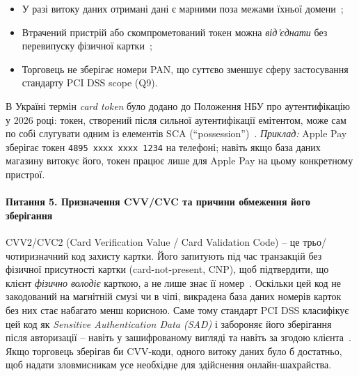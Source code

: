 \begin{itemize}[noitemsep]
    \item У разі витоку даних отримані дані є марними поза межами їхньої домени~\cite{emv_tokenisation_qrg};
    \item Втрачений пристрій або скомпрометований токен можна \emph{від'єднати} без перевипуску фізичної 
        картки~\cite{emv_tokenisation};
    \item Торговець не зберігає номери PAN, що суттєво зменшує сферу застосування стандарту PCI DSS scope (Q9).
\end{itemize}
В Україні термін \emph{card token} було додано до Положення НБУ про аутентифікацію у 2026 році: токен, створений 
після сильної аутентифікації емітентом, може сам по собі слугувати одним із елементів SCA (\enquote{possession})~\cite{nbu4_2026}. 
\textit{Приклад:} Apple Pay зберігає токен \texttt{4895\,xxxx\,xxxx\,1234} на телефоні; навіть якщо база даних 
магазину витокує його, токен працює лише для Apple Pay на цьому конкретному пристрої.

\paragraph{Питання 5. Призначення CVV/CVC та причини обмеження його зберігання}
CVV2/CVC2 (Card Verification Value / Card Validation Code) -- це трьо/чотиризначний код захисту картки. Його 
запитують під час транзакцій без фізичної присутності картки (card-not-present, CNP), щоб підтвердити, що клієнт 
\emph{фізично володіє} карткою, а не лише знає її номер~\cite{pci_faq_cvv_request}. Оскільки цей код не закодований 
на магнітній смузі чи в чіпі, викрадена база даних номерів карток без них стає набагато менш корисною. Саме тому 
стандарт PCI DSS класифікує цей код як \emph{Sensitive Authentication Data (SAD)} і забороняє його зберігання 
після авторизації -- навіть у зашифрованому вигляді та навіть за згодою клієнта~\cite{pci_faq_1210, pci_faq_1280}. 
Якщо торговець зберігав би CVV-коди, одного витоку даних було б достатньо, щоб надати зловмисникам усе необхідне 
для здійснення онлайн-шахрайства.

